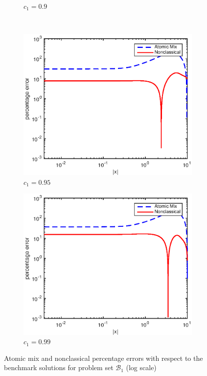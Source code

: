 \documentclass[12pt]{article}
\newcommand{\setb}{\mathcal{B}}
\begin{document}
{\begin{figure}[p]
\begin{subfigure}{0.495\textwidth}
        \caption{$c_1 = 0.9$}
        \label{figerrD90}
    \end{subfigure}
    \\
    \centering
    \begin{subfigure}{0.495\textwidth}
        \centering
        \includegraphics[width=\textwidth]{NSE_err_D95.eps}
        \caption{$c_1 = 0.95$}
        \label{figerrD95}
    \end{subfigure}
    \hfill
    \begin{subfigure}{0.495\textwidth}
        \centering
        \includegraphics[width=\textwidth]{NSE_err_D99.eps}
        \caption{$c_1 = 0.99$}
        \label{figerrD99}
    \end{subfigure}
    \caption{Atomic mix and nonclassical percentage errors with respect to the benchmark solutions for problem set $\setb_1$ (log scale)}
    \label{figerrD2}
\end{figure}





}
\end{document}
